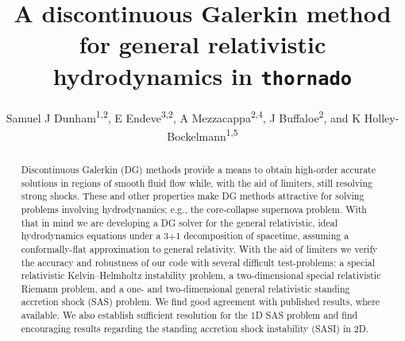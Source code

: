 \documentclass[letterpaper]{jpconf}
\newcommand{\thornado}{\texttt{thornado}}
\begin{document}
\nocite{*}

\title{A discontinuous Galerkin method for general relativistic hydrodynamics in \thornado}

\author{Samuel J Dunham\textsuperscript{1,2}, E Endeve\textsuperscript{3,2}, A Mezzacappa\textsuperscript{2,4}, J Buffaloe\textsuperscript{2}, and K Holley-Bockelmann\textsuperscript{1,5}}

\address{\textsuperscript{1} Department of Astronomy, Vanderbilt University, 6301 Stevenson Center Lane, Nashville TN, 37235, USA}
\address{\textsuperscript{2} Department of Physics and Astronomy, University of Tennessee-Knoxville, Nielsen Physics Building, 401, 1408 Circle Drive, Knoxville TN, 37996, USA}
\address{\textsuperscript{3} Computer Science and Mathematics Division, Oak Ridge National Laboratory, Oak Ridge, TN 37831, USA}
\address{\textsuperscript{4} Joint Institute for Computational Sciences, Oak Ridge National Laboratory, Oak Ridge, TN 37831, USA}
\address{\textsuperscript{5} Department of Life and Physical Sciences, Fisk University, 1000 17\textsuperscript{th} Ave N, Nashville TN, 37208, USA}


\begin{abstract}
Discontinuous Galerkin (DG) methods provide a means to obtain high-order accurate solutions in regions of smooth fluid flow while, with the aid of limiters, still resolving strong shocks. These and other properties make DG methods attractive for solving problems involving hydrodynamics; e.g., the core-collapse supernova problem. With that in mind we are developing a DG solver for the general relativistic, ideal hydrodynamics equations under a 3+1 decomposition of spacetime, assuming a conformally-flat approximation to general relativity. With the aid of limiters we verify the accuracy and robustness of our code with several difficult test-problems: a special relativistic Kelvin--Helmholtz instability problem, a two-dimensional special relativistic Riemann problem, and a one- and two-dimensional general relativistic standing accretion shock (SAS) problem. We find good agreement with published results, where available. We also establish sufficient resolution for the 1D SAS problem and find encouraging results regarding the standing accretion shock instability (SASI) in 2D.

\end{abstract}
\end{document}
